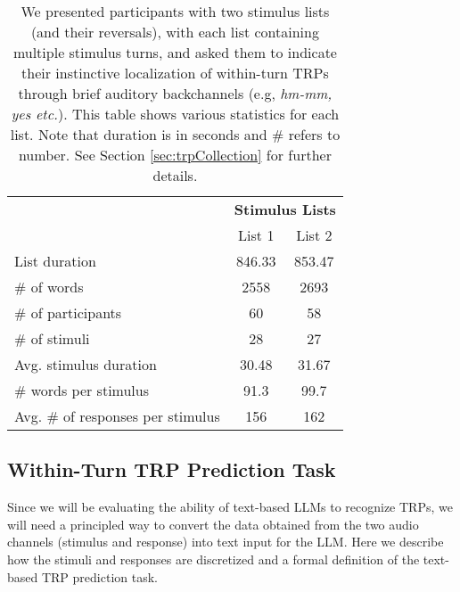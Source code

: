 \begin{table}[htp!]
    \centering
    \renewcommand{\arraystretch}{1.2}
    \begin{tabular}{p{3.8cm}|cc }

                                           & \multicolumn{2}{c}{\textbf{Stimulus Lists}}          \\
                                           & List 1                                      & List 2 \\
        \hline
        List duration                      & 846.33                                      & 853.47 \\
        \# of words                        & 2558                                        & 2693   \\
        \# of participants                 & 60                                          & 58     \\
        \# of stimuli                      & 28                                          & 27     \\
        Avg. stimulus duration             & 30.48                                       & 31.67  \\
        \# words per stimulus              & 91.3                                        & 99.7   \\
        Avg. \#  of responses per stimulus & 156                                         & 162    \\
    \end{tabular}
    \caption{We presented participants with two stimulus lists (and their reversals), with each list containing multiple stimulus turns, and asked them to indicate their instinctive localization of within-turn TRPs through brief auditory backchannels (e.g, \emph{hm-mm, \emph{yes} etc.}). This table shows various statistics for each list. Note that duration is in seconds and \# refers to number. See Section \ref{sec:trpCollection} for further details.}
\end{table}



\subsection{Within-Turn TRP Prediction Task}
\label{sec:task}

Since we will be evaluating the ability of text-based LLMs to recognize TRPs, we will need a principled way to convert the data obtained from the two audio channels (stimulus and response) into text input for the LLM. Here we describe how the stimuli and responses are discretized and a formal definition of the text-based TRP prediction task.

